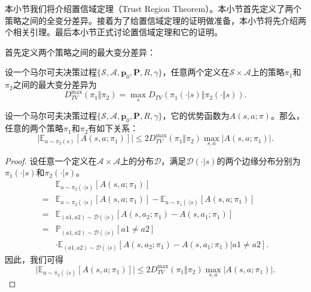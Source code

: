 本小节我们将介绍置信域定理\cite{kakade2002approximately}（Trust Region Theorem）。本小节首先定义了两个策略之间的全变分差异。接着为了给置信域定理的证明做准备，本小节将先介绍两个相关引理。最后本小节正式讨论置信域定理和它的证明。

首先定义两个策略之间的最大变分差异：
\begin{definition}[最大变分差异]
    设一个马尔可夫决策过程$\{\mathcal{S}, \mathcal{A}, \mathbf{p}_0, \mathbf{P}, R, \gamma\}$，任意两个定义在$\mathcal{S} \times \mathcal{A}$上的策略$\pi_1$和$\pi_2$之间的最大变分差异为
    \begin{equation}
        D^{\max}_{TV}(\pi_1 \Vert \pi_2) = \max_{s} D_{TV}(\pi_1(\cdot \vert s) \Vert \pi_2(\cdot \Vert s)).
    \end{equation}
\end{definition}

\begin{lemma}\label{lem:trust-region-lemma1}
    设一个马尔可夫决策过程$\{\mathcal{S}, \mathcal{A}, \mathbf{p}_0, \mathbf{P}, R, \gamma\}$，它的优势函数为$A(s, a; \pi)$。那么，任意的两个策略$\pi_1$和$\pi_2$有如下关系：
    \begin{equation}
        \vert \mathbb{E}_{a \sim \pi_2(s)} [A(s, a; \pi_1)] \vert
        \le 2 D^{\max}_{TV}(\pi_1 \Vert \pi_2) \max_{s, a} \vert A(s, a; \pi_1) \vert.
    \end{equation}
\end{lemma}
\begin{proof}
    设任意一个定义在$\mathcal{A}\times\mathcal{A}$上的分布$\mathcal{D}$，满足$\mathcal{D}(\cdot \vert s)$的两个边缘分布分别为$\pi_1(\cdot \vert s)$和$\pi_2(\cdot \vert s)$。
    \begin{align*}
        &\mathbb{E}_{a \sim \pi_2(\cdot \vert s)} [A(s, a; \pi_1)] \\
        =& \mathbb{E}_{a \sim \pi_2(\cdot \vert s)} [A(s, a; \pi_1)] - \mathbb{E}_{a \sim \pi_1(\cdot \vert s)} [A(s, a; \pi_1)]\\
        =& \mathbb{E}_{(a1, a2) \sim \mathcal{D}(\cdot \vert s)}[A(s, a_2; \pi_1) - A(s, a_1; \pi_1)]\\
        =& \mathbb{P}_{(a1, a2) \sim \mathcal{D}(\cdot \vert s)} [a1 \ne a2] \\ &\cdot
        \mathbb{E}_{(a1, a2) \sim \mathcal{D}(\cdot \vert s)}[A(s, a_2; \pi_1) - A(s, a_1; \pi_1) \vert a1 \ne a2].
    \end{align*}
    因此，我们可得
    \begin{equation*}
        \vert \mathbb{E}_{a \sim \pi_2(\cdot \vert s)} [A(s, a; \pi_1)] \vert 
        \le 2 D^{\max}_{TV}(\pi_1 \Vert \pi_2) \max_{s, a} \vert A(s, a; \pi_1) \vert.
    \end{equation*}
\end{proof}

